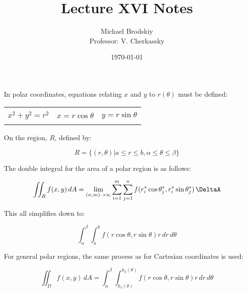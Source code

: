 \documentclass[12pt]{article}
\title{Lecture XVI Notes}
\date{\today}
\author{Michael Brodskiy\\ \small Professor: V. Cherkassky}
\begin{document}
\maketitle

In polar coordinates, equations relating $x$ and $y$ to $r(\theta)$ must be defined:

\begin{center}
\begin{tabular}{|c c c|}
    \hline
    & & \\
$x^2+y^2=r^2$ & $x=r\cos\theta$ & $y=r\sin\theta$\\
    & & \\
    \hline
\end{tabular}
\end{center}

On the region, $R$, defined by:

$$R=\{(r,\theta)|a\leq r\leq b, \alpha\leq \theta\leq \beta\}$$

The double integral for the area of a polar region is as follows:

$$\iint_R f(x,y)\,dA=\lim_{(n,m)\to\infty} \sum_{i=1}^m\sum_{j=1}^n f(r_i^*\cos\theta_j^*,r_i^*\sin\theta_j^*)\,\DeltaA$$

This all simplifies down to:

$$\int_\alpha^\beta\int_a^b f(r\cos\theta,r\sin\theta)r\, dr\, d\theta$$

For general polar regions, the same process as for Cartesian coordinates is used:

$$\iint_D f(x,y)\,dA=\int_\alpha^\beta\int_{h_1(\theta)}^{h_2(\theta)} f(r\cos\theta,r\sin\theta)r\,dr\,d\theta$$
\end{document}
